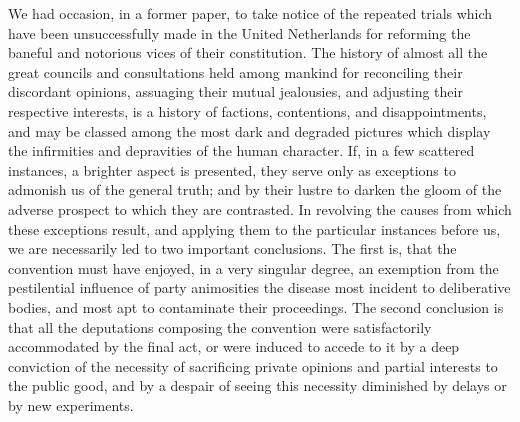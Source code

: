 We had occasion, in a former paper, to take notice of the repeated trials which have been unsuccessfully made in the United Netherlands for reforming the baneful and notorious vices of their constitution. 
The history of almost all the great councils and consultations held among mankind for reconciling their discordant opinions, assuaging their mutual jealousies, and adjusting their respective interests, is a history of factions, contentions, and disappointments, and may be classed among the most dark and degraded pictures which display the infirmities and depravities of the human character. 
If, in a few scattered instances, a brighter aspect is presented, they serve only as exceptions to admonish us of the general truth; and by their lustre to darken the gloom of the adverse prospect to which they are contrasted. 
In revolving the causes from which these exceptions result, and applying them to the particular instances before us, we are necessarily led to two important conclusions. 
The first is, that the convention must have enjoyed, in a very singular degree, an exemption from the pestilential influence of party animosities the disease most incident to deliberative bodies, and most apt to contaminate their proceedings. 
The second conclusion is that all the deputations composing the convention were satisfactorily accommodated by the final act, or were induced to accede to it by a deep conviction of the necessity of sacrificing private opinions and partial interests to the public good, and by a despair of seeing this necessity diminished by delays or by new experiments.


